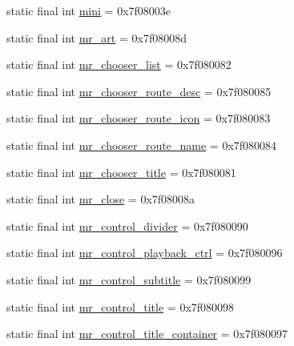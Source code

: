 \begin{CompactItemize}
\item 
static final int \hyperlink{classandroid_1_1support_1_1v7_1_1palette_1_1_r_1_1id_c76643351399c89445f52bce2905eda9}{mini} = 0x7f08003e
\item 
static final int \hyperlink{classandroid_1_1support_1_1v7_1_1palette_1_1_r_1_1id_ab0747d4cbda8d928ba8408e8a76ca07}{mr\_\-art} = 0x7f08008d
\item 
static final int \hyperlink{classandroid_1_1support_1_1v7_1_1palette_1_1_r_1_1id_1726fac07fa05f1808bad53f6ce49bb7}{mr\_\-chooser\_\-list} = 0x7f080082
\item 
static final int \hyperlink{classandroid_1_1support_1_1v7_1_1palette_1_1_r_1_1id_5195ab9e150268f526d1335102da6e12}{mr\_\-chooser\_\-route\_\-desc} = 0x7f080085
\item 
static final int \hyperlink{classandroid_1_1support_1_1v7_1_1palette_1_1_r_1_1id_0b6c9eb2f7b3b94d1942633f05683de5}{mr\_\-chooser\_\-route\_\-icon} = 0x7f080083
\item 
static final int \hyperlink{classandroid_1_1support_1_1v7_1_1palette_1_1_r_1_1id_51fd43fde20ea44e85198793894bf09a}{mr\_\-chooser\_\-route\_\-name} = 0x7f080084
\item 
static final int \hyperlink{classandroid_1_1support_1_1v7_1_1palette_1_1_r_1_1id_8d360f5cfa0b9fcd96df52b02bd129b9}{mr\_\-chooser\_\-title} = 0x7f080081
\item 
static final int \hyperlink{classandroid_1_1support_1_1v7_1_1palette_1_1_r_1_1id_2d0f3ae3b41ec15b92d59e283091d914}{mr\_\-close} = 0x7f08008a
\item 
static final int \hyperlink{classandroid_1_1support_1_1v7_1_1palette_1_1_r_1_1id_43a2ea03974aa00b689b2c9edee50fda}{mr\_\-control\_\-divider} = 0x7f080090
\item 
static final int \hyperlink{classandroid_1_1support_1_1v7_1_1palette_1_1_r_1_1id_71786ecf5680aa585cdd6604650d9f71}{mr\_\-control\_\-playback\_\-ctrl} = 0x7f080096
\item 
static final int \hyperlink{classandroid_1_1support_1_1v7_1_1palette_1_1_r_1_1id_f3b7a566024418de49fba023831ab064}{mr\_\-control\_\-subtitle} = 0x7f080099
\item 
static final int \hyperlink{classandroid_1_1support_1_1v7_1_1palette_1_1_r_1_1id_3017d8541831033e764210a1ddaa0f4c}{mr\_\-control\_\-title} = 0x7f080098
\item 
static final int \hyperlink{classandroid_1_1support_1_1v7_1_1palette_1_1_r_1_1id_08712d970c96a58e7115d5fcf343b6b7}{mr\_\-control\_\-title\_\-container} = 0x7f080097
\item 

\end{CompactItemize}
